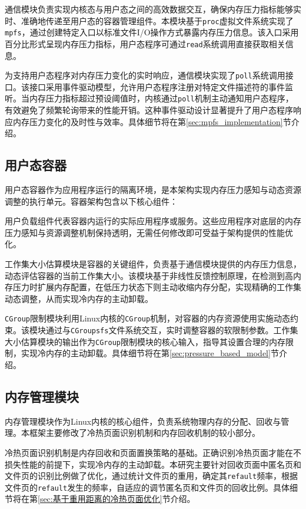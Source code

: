 通信模块负责实现内核态与用户态之间的高效数据交互，确保内存压力指标能够实时、准确地传递至用户态的容器管理组件。本模块基于\texttt{proc}虚拟文件系统实现了\texttt{mpfs}，通过创建特定入口以标准文件I/O操作方式暴露内存压力信息。该入口采用百分比形式呈现内存压力指标，用户态程序可通过\texttt{read}系统调用直接获取相关信息。

为支持用户态程序对内存压力变化的实时响应，通信模块实现了\texttt{poll}系统调用接口。该接口采用事件驱动模型，允许用户态程序注册对特定文件描述符的事件监听。当内存压力指标超过预设阈值时，内核通过\texttt{poll}机制主动通知用户态程序，有效避免了频繁轮询带来的性能开销。这种事件驱动设计显著提升了用户态程序响应内存压力变化的及时性与效率。具体细节将在第\ref{sec:mpfs_implementation}节介绍。

\subsection{用户态容器}

用户态容器作为应用程序运行的隔离环境，是本架构实现内存压力感知与动态资源调整的执行单元。容器架构包含以下核心组件：

用户负载组件代表容器内运行的实际应用程序或服务。这些应用程序对底层的内存压力感知与资源调整机制保持透明，无需任何修改即可受益于架构提供的性能优化。

工作集大小估算模块是容器的关键组件，负责基于通信模块提供的内存压力信息，动态评估容器的当前工作集大小。该模块基于非线性反馈控制原理，在检测到高内存压力时扩展内存配置，在低压力状态下则主动收缩内存分配，实现精确的工作集动态调整，从而实现冷内存的主动卸载。

\texttt{CGroup}限制模块利用Linux内核的\texttt{CGroup}机制，对容器的内存资源使用实施动态约束。该模块通过与\texttt{CGroupsfs}文件系统交互，实时调整容器的软限制参数。工作集大小估算模块的输出作为\texttt{CGroup}限制模块的核心输入，指导其设置合理的内存限制，实现冷内存的主动卸载。具体细节将在第\ref{sec:pressure_based_model}节介绍。

\subsection{内存管理模块}

内存管理模块作为Linux内核的核心组件，负责系统物理内存的分配、回收与管理。本框架主要修改了冷热页面识别机制和内存回收机制的较小部分。

冷热页面识别机制是内存回收和页面置换策略的基础。正确识别冷热页面才能在不损失性能的前提下，实现冷内存的主动卸载。本研究主要针对回收页面中匿名页和文件页的识别比例做了优化，通过统计文件页的重用，确定其\texttt{refault}频率，根据文件页的\texttt{refault}发生的频率，自适应的调节匿名页和文件页的回收比例。具体细节将在第\ref{sec:基于重用距离的冷热页面优化}节介绍。

